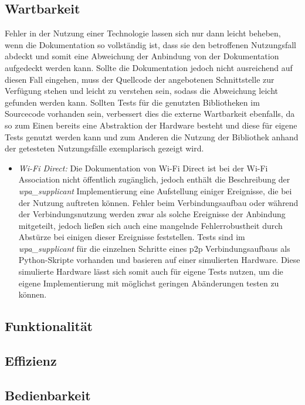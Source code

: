 		\subsection{Wartbarkeit}
		Fehler in der Nutzung einer Technologie lassen sich nur dann leicht beheben, wenn die Dokumentation so vollständig ist, dass sie den betroffenen Nutzungsfall abdeckt und somit eine Abweichung der Anbindung von der Dokumentation aufgedeckt werden kann. Sollte die Dokumentation jedoch nicht ausreichend auf diesen Fall eingehen, muss der Quellcode der angebotenen Schnittstelle zur Verfügung stehen und leicht zu verstehen sein, sodass die Abweichung leicht gefunden werden kann. Sollten Tests für die genutzten Bibliotheken im Sourcecode vorhanden sein, verbessert dies die externe Wartbarkeit ebenfalls, da so zum Einen bereits eine Abstraktion der Hardware besteht und diese für eigene Tests genutzt werden kann und zum Anderen die Nutzung der Bibliothek anhand der getesteten Nutzungsfälle exemplarisch gezeigt wird.
		\begin{itemize}
		\item {\it Wi-Fi Direct:} Die Dokumentation von Wi-Fi Direct ist bei der Wi-Fi Association nicht öffentlich zugänglich, jedoch enthält die Beschreibung der {\it wpa\_supplicant} Implementierung eine Aufstellung einiger Ereignisse, die bei der Nutzung auftreten können. Fehler beim Verbindungsaufbau oder während der Verbindungsnutzung werden zwar als solche Ereignisse der Anbindung mitgeteilt, jedoch ließen sich auch eine mangelnde Fehlerrobustheit durch Abstürze bei einigen dieser Ereignisse feststellen. Tests sind im {\it wpa\_supplicant} für die einzelnen Schritte eines p2p Verbindungsaufbaus als Python-Skripte vorhanden und basieren auf einer simulierten Hardware. Diese simulierte Hardware lässt sich somit auch für eigene Tests nutzen, um die eigene Implementierung mit möglichst geringen Abänderungen testen zu können.
		
		\end{itemize}
		\subsection{Funktionalität}
		
		\subsection{Effizienz}
		
		\subsection{Bedienbarkeit}
		
